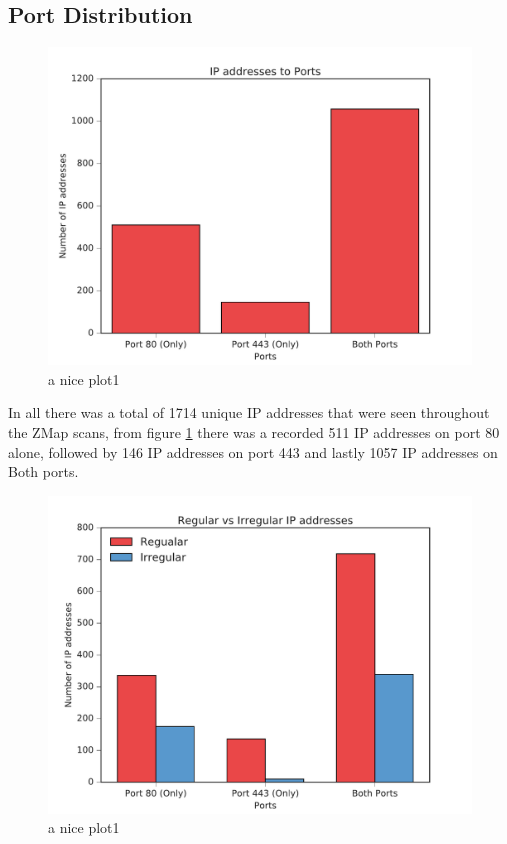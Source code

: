 \documentclass[a4wide,leqno,12pt]{report}
\begin{document}
\subsection{Port Distribution}
\begin{figure}[H]
\centering
\includegraphics[scale=.5]{pdf_images/IPaddressestoPorts}
\caption{a nice plot1}
\label{fig:ports}
\end{figure}
In all there was a total of 1714 unique IP addresses that were seen throughout the ZMap scans, from figure \ref{fig:ports} there was a recorded 511 IP addresses on port 80 alone, followed by 146 IP addresses on port 443 and lastly 1057 IP addresses on Both ports.

\begin{figure}[H]
\centering
\includegraphics[scale=.5]{pdf_images/RegularVsIrregularIPaddresses}
\caption{a nice plot1}
\label{fig:portsIrreg}
\end{figure}
\end{document}
